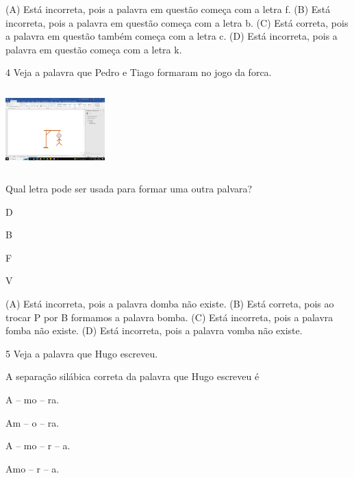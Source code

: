 (A) Está incorreta, pois a palavra em questão começa com a letra f.
(B) Está incorreta, pois a palavra em questão começa com a letra b.
(C) Está correta, pois a palavra em questão também começa com a letra c.
(D) Está incorreta, pois a palavra em questão começa com a letra k.

\num{4} Veja a palavra que Pedro e Tiago formaram no jogo da forca.

\includegraphics[width=1.50909in,height=1.22355in]{media/image150.png}

Qual letra pode ser usada para formar uma outra palvara?

\begin{minipage}{.5\textwidth}
\begin{escolha}
\item D

\item B

\item F

\item V
\end{escolha}
\end{minipage}

(A) Está incorreta, pois a palavra domba não existe.
(B) Está correta, pois ao trocar P por B formamos a palavra bomba.
(C) Está incorreta, pois a palavra fomba não existe.
(D) Está incorreta, pois a palavra vomba não existe.

\num{5} Veja a palavra que Hugo escreveu.

A separação silábica correta da palavra que Hugo escreveu é

\begin{minipage}{.5\textwidth}
\begin{escolha}
\item A -- mo -- ra.

\item Am -- o -- ra.

\item A -- mo -- r -- a.

\item Amo -- r -- a.
\end{escolha}
\end{minipage}

